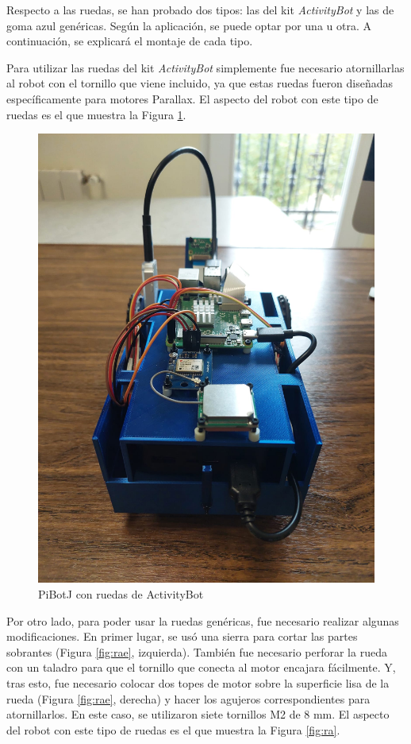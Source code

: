 Respecto a las ruedas, se han probado dos tipos: las del kit \textit{ActivityBot} y las de goma azul genéricas. Según la aplicación, se puede optar por una u otra. A continuación, se explicará el montaje de cada tipo.

Para utilizar las ruedas del kit \textit{ActivityBot} simplemente fue necesario atornillarlas al robot con el tornillo que viene incluido, ya que estas ruedas fueron diseñadas específicamente para motores Parallax. El aspecto del robot con este tipo de ruedas es el que muestra la Figura \ref{fig:ab}.

\begin{figure} [h!]
	\begin{center}
		\includegraphics[width=12cm]{figs/cap5/ab.jpeg}
	\end{center}
	\caption{PiBotJ con ruedas de ActivityBot} 
	\label{fig:ab}
\end{figure}

Por otro lado, para poder usar la ruedas genéricas, fue necesario realizar algunas modificaciones. En primer lugar, se usó una sierra para cortar las partes sobrantes (Figura \ref{fig:rae}, izquierda). También fue necesario perforar la rueda con un taladro para que el tornillo que conecta al motor encajara fácilmente. Y, tras esto, fue necesario colocar dos topes de motor sobre la superficie lisa de la rueda (Figura \ref{fig:rae}, derecha) y hacer los agujeros correspondientes para atornillarlos. En este caso, se utilizaron siete tornillos M2 de 8 mm. El aspecto del robot con este tipo de ruedas es el que muestra la Figura \ref{fig:ra}.

